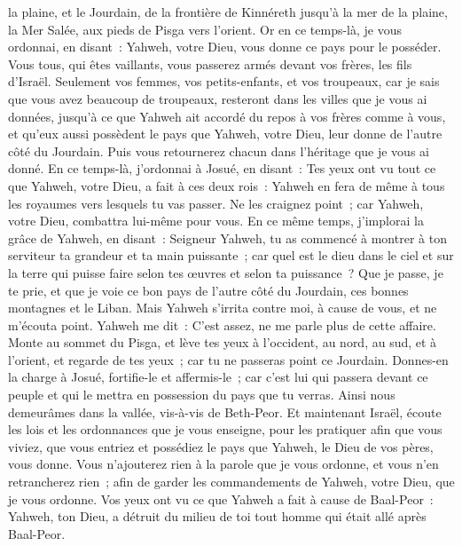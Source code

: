 \begin{multicols}{2}
la plaine, et le Jourdain, de la frontière de Kinnéreth jusqu'à la mer de la plaine, la Mer Salée, aux pieds de Pisga vers l'orient.
Or en ce temps-là, je vous ordonnai, en disant~: Yahweh, votre Dieu, vous donne ce pays pour le posséder. Vous tous, qui êtes vaillants, vous passerez armés devant vos frères, les fils d'Israël.
Seulement vos femmes, vos petits-enfants, et vos troupeaux, car je sais que vous avez beaucoup de troupeaux, resteront dans les villes que je vous ai données,
jusqu'à ce que Yahweh ait accordé du repos à vos frères comme à vous, et qu'eux aussi possèdent le pays que Yahweh, votre Dieu, leur donne de l'autre côté du Jourdain. Puis vous retournerez chacun dans l'héritage que je vous ai donné.
En ce temps-là, j'ordonnai à Josué, en disant~: Tes yeux ont vu tout ce que Yahweh, votre Dieu, a fait à ces deux rois~: Yahweh en fera de même à tous les royaumes vers lesquels tu vas passer.
Ne les craignez point~; car Yahweh, votre Dieu, combattra lui-même pour vous.
En ce même temps, j'implorai la grâce de Yahweh, en disant~:
Seigneur Yahweh, tu as commencé à montrer à ton serviteur ta grandeur et ta main puissante~; car quel est le dieu dans le ciel et sur la terre qui puisse faire selon tes œuvres et selon ta puissance~?
Que je passe, je te prie, et que je voie ce bon pays de l'autre côté du Jourdain, ces bonnes montagnes et le Liban.
Mais Yahweh s'irrita contre moi, à cause de vous, et ne m'écouta point. Yahweh me dit~: C'est assez, ne me parle plus de cette affaire.
Monte au sommet du Pisga, et lève tes yeux à l'occident, au nord, au sud, et à l'orient, et regarde de tes yeux~; car tu ne passeras point ce Jourdain.
Donnes-en la charge à Josué, fortifie-le et affermis-le~; car c'est lui qui passera devant ce peuple et qui le mettra en possession du pays que tu verras.
Ainsi nous demeurâmes dans la vallée, vis-à-vis de Beth-Peor.
\VerseOne{}Et maintenant Israël, écoute les lois et les ordonnances que je vous enseigne, pour les pratiquer afin que vous viviez, que vous entriez et possédiez le pays que Yahweh, le Dieu de vos pères, vous donne.
Vous n'ajouterez rien à la parole que je vous ordonne, et vous n'en retrancherez rien~; afin de garder les commandements de Yahweh, votre Dieu, que je vous ordonne.
Vos yeux ont vu ce que Yahweh a fait à cause de Baal-Peor~: Yahweh, ton Dieu, a détruit du milieu de toi tout homme qui était allé après Baal-Peor.

\end{multicols}
